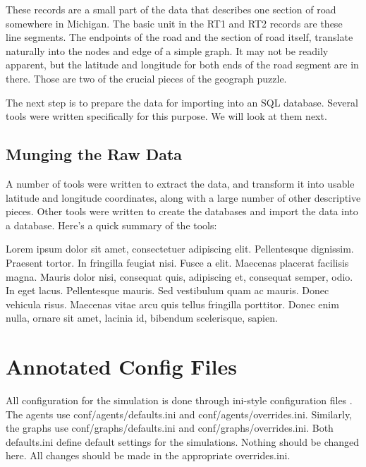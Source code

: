 \documentclass[11pt,letterpaper,onecolumn,twoside,openright,draft]{report}
\begin{document}
These records are a small part of the data that describes one section of road somewhere in Michigan.
The basic unit in the RT1 and RT2 records are these line segments.
The endpoints of the road and the section of road itself, translate naturally into the nodes and edge of a simple graph.
It may not be readily apparent, but the latitude and longitude for both ends of the road segment are in there.
Those are two\cite{colu92} of the crucial pieces of the geograph puzzle.

The next step is to prepare the data for importing into an SQL database.
Several tools were written specifically for this purpose.
We will look at them next.

\section{Munging the Raw Data}

A number of tools were written to extract the data, and transform it into usable latitude and longitude coordinates, along with a large number of other descriptive pieces.
Other tools were written to create the databases and import the data into a database.
Here's a quick summary of the tools:


Lorem ipsum dolor sit amet, consectetuer adipiscing elit.
Pellentesque dignissim.
Praesent tortor.
In fringilla feugiat nisi.
Fusce a elit.
Maecenas placerat facilisis magna.
Mauris dolor nisi, consequat quis, adipiscing et, consequat semper, odio.
In eget lacus.
Pellentesque mauris.
Sed vestibulum quam ac mauris.
Donec vehicula risus.
Maecenas vitae arcu quis tellus fringilla porttitor.
Donec enim nulla, ornare sit amet, lacinia id, bibendum scelerisque, sapien.

\chapter{Annotated Config Files}
All configuration for the simulation is done through ini-style configuration files .
The agents use conf/agents/defaults.ini and conf/agents/overrides.ini.
Similarly, the graphs use conf/graphs/defaults.ini and conf/graphs/overrides.ini.
Both defaults.ini define default settings for the simulations.
Nothing should be changed here.
All changes should be made in the appropriate overrides.ini.
\end{document}
